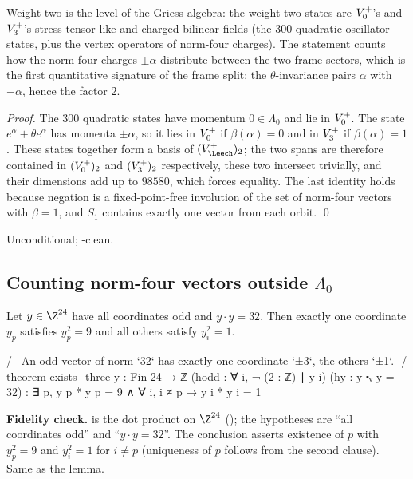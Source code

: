 \begin{physics}
Weight two is the level of the Griess algebra: the weight-two states are $V_0^{+}$'s and $V_3^{+}$'s stress-tensor-like and charged bilinear fields (the $300$ quadratic oscillator states, plus the vertex operators of norm-four charges). The statement counts how the norm-four charges $\pm\alpha$ distribute between the two frame sectors, which is the first quantitative signature of the frame split; the $\theta$-invariance pairs $\alpha$ with $-\alpha$, hence the factor $2$.
\end{physics}
\emph{Proof.}  The $300$ quadratic states have momentum $0\in\Lambda_0$ and lie in $V_0^{+}$.  The state
$e^\alpha+\theta e^\alpha$ has momenta $\pm\alpha$, so it lies in $V_0^{+}$ if $\beta(\alpha)=0$ and in
$V_3^{+}$ if $\beta(\alpha)=1$.  These states together form a basis of $(V_\Leech^+)_2$; the two
spans are therefore contained in $(V_0^{+})_2$ and $(V_3^{+})_2$ respectively, these two intersect
trivially, and their dimensions add up to $98580$, which forces equality.  The last identity
holds because negation is a fixed-point-free involution of the set of norm-four vectors with
$\beta=1$, and $S_1$ contains exactly one vector from each orbit. \qed
\begin{status}Unconditional; -clean.\end{status}

\subsection{Counting norm-four vectors outside \texorpdfstring{$\Lambda_0$}{Lambda0}}

\begin{lemma}\label{ch11:lem:three}
Let $y\in\Z^{24}$ have all coordinates odd and $y\cdot y=32$.  Then exactly one coordinate $y_p$
satisfies $y_p^2=9$ and all others satisfy $y_i^2=1$.
\end{lemma}
\begin{leancode}
/-- An odd vector of norm `32` has exactly one coordinate `±3`, the others `±1`. -/
theorem exists_three {y : Fin 24 → ℤ} (hodd : ∀ i, ¬ (2 : ℤ) ∣ y i) (hy : y ⬝ᵥ y = 32) :
    ∃ p, y p * y p = 9 ∧ ∀ i, i ≠ p → y i * y i = 1
\end{leancode}
\begin{dictionary}
\textbf{Fidelity check.}   is the dot product on $\Z^{24}$ (); the
hypotheses are ``all coordinates odd'' and ``$y\cdot y=32$''.  The conclusion asserts existence of
$p$ with $y_p^2=9$ and $y_i^2=1$ for $i\ne p$ (uniqueness of $p$ follows from the second clause).
Same as the lemma.
\end{dictionary}

